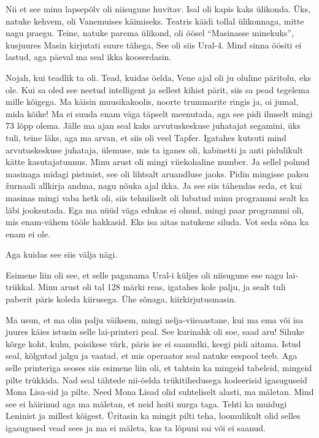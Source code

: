 Nii et see minu lapsepõlv oli niisugune huvitav. Isal oli kapis kaks ülikonda. Üks, natuke kehvem, oli Vanemuises käimiseks. Teatris käidi tollal ülikonnaga, mitte nagu praegu. Teine, natuke parema ülikond, oli öösel \enquote{Masinasse minekuks}, kusjuures Masin kirjutati suure tähega, See oli siis Ural-4. Mind sinna öösiti ei lastud, aga  päeval ma seal ikka kooserdasin. 


Nojah, kui teadlik ta oli. Tead, kuidas öelda, Vene ajal oli ju oluline päritolu, eks ole. Kui sa oled see neetud intelligent ja sellest kihist pärit,  siis sa pead tegelema mille kõigega. Ma käisin muusikakoolis, noorte trummarite ringis ja, oi jumal, mida kõike! Ma ei suuda enam väga täpselt meenutada, aga see pidi ilmselt mingi 73 lõpp olema. Jälle ma ajan seal kaks arvutuskeskuse juhatajat segamini, üks tuli, teine läks, aga ma arvan, et siis oli veel Tapfer. Igatahes kutsuti mind arvutuskeskuse juhataja, ülemuse,  mis ta iganes oli, kabinetti ja anti pidulikult kätte kasutajatunnus. Minu arust oli mingi viiekohaline number. Ja sellel polnud masinaga midagi pistmist, see oli lihtsalt aruandluse jaoks. Pidin mingisse paksu žurnaali allkirja andma, nagu nõuka ajal ikka. Ja see siis tähendas seda, et kui masinas mingi vaba hetk oli, siis tehniliselt oli lubatud minu programmi sealt ka läbi jooksutada. Ega ma nüüd väga edukas ei olnud, mingi paar programmi oli, mis enam-vähem tööle hakkasid. Eks isa aitas natukene siluda. Vot seda sõna ka enam ei ole. 

Aga kuidas see siis välja nägi. 

Esimene liin oli see, et selle paganama Ural-i küljes oli niisugune ese nagu lai-trükkal. Minu arust oli tal 128 märki reas, igatahes kole palju, ja sealt tuli paberit päris koleda kiirusega. Ühe sõnaga, kiirkirjutusmasin. 

Ma usun, et ma olin palju väiksem, mingi nelja-viieaastane, kui ma ema või isa juures käies istusin selle lai-printeri peal. See kurinahk oli soe, saad aru! Sihuke kõrge koht, kuhu, poisikese värk, päris ise ei saanudki, keegi pidi aitama. Istud seal, kõlgutad jalgu ja vaatad, et mis operaator seal natuke eespool teeb. Aga selle printeriga seoses siis esimene liin oli, et tahtsin ka mingeid tabeleid, mingeid pilte trükkida. Nad seal tähtede nii-öelda  trükitihedusega kodeerisid  igasuguseid Mona Lisa-sid ja pilte. Need Mona Lisad olid suhteliselt alasti, ma mäletan. Mind see ei häirinud aga ma mäletan, et neid hoiti nurga taga. Tehti ka muidugi Leninist ja millest kõigest. Üritasin ka mingit pilti teha, loomulikult olid selles igasugused vead sees ja ma ei mäleta, kas ta lõpuni sai või ei saanud. 


